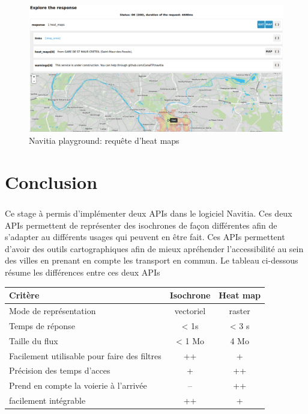 \documentclass[a4paper]{report}
\begin{document}
\begin{figure}[H]
	\begin{center}
		\includegraphics[width=400pt]{image/n_p_heat_map}
		\caption{Navitia playground: requête d'heat maps}
		\label{Navitia playground: requête d'heat maps}
	\end{center}
\end{figure}

\chapter*{Conclusion}

\paragraph{} Ce stage à permis d'implémenter deux APIs dans le logiciel Navitia. Ces deux APIs permettent de représenter des isochrones de façon différentes afin de s'adapter au différents usages qui peuvent en être fait. Ces APIs permettent d'avoir des outils cartographiques afin de mieux apréhender l'accessibilité au sein des villes en prenant en compte les transport en commun. Le tableau ci-dessous résume les différences entre ces deux APIs\\

\begin{center}
  \begin{tabular} {|l|c|c|}
  \hline
  Critère & Isochrone & Heat map \\
  \hline
  Mode de représentation & vectoriel & raster \\
  \hline
  Temps de réponse & < 1s &  < 3 s \\
  \hline
  Taille du flux & < 1 Mo & 4 Mo \\
  \hline
  Facilement utilisable pour faire des filtres & ++ & + \\
  \hline
   Précision des temps d'acces & + & ++ \\
  \hline
  Prend en compte la voierie à l'arrivée & -- & ++ \\
  \hline
  facilement intégrable & ++ & + \\
  \hline
  \end{tabular}
\end{center}
\end{document}
